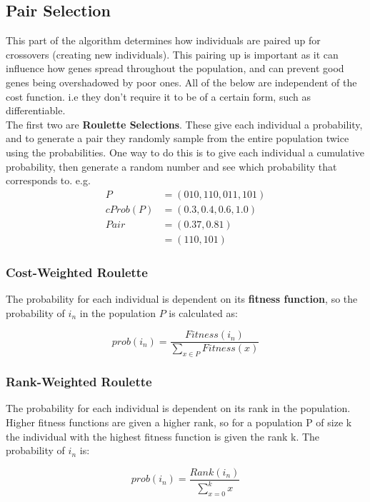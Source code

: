 \subsection{Pair Selection}
This part of the algorithm determines how individuals are paired up for crossovers (creating new individuals). This pairing up is important as it can influence how genes spread throughout the population, and can prevent good genes being overshadowed by poor ones. All of the below are independent of the cost function. i.e they don't require it to be of a certain form, such as differentiable. \\

\noindent The first two are \textbf{Roulette Selections}. These give each individual a probability, and to generate a pair they randomly sample from the entire population twice using the probabilities. One way to do this is to give each individual a cumulative probability, then generate a random number and see which probability that corresponds to. e.g.
\begin{align}
    P &= (010,110,011,101) \nonumber \\
    cProb(P) &= (0.3,0.4,0.6,1.0) \nonumber \\
    Pair &= (0.37,0.81) \nonumber \\
         &= (110,101) \nonumber
\end{align}


\subsubsection{Cost-Weighted Roulette}
The probability for each individual is dependent on its \textbf{fitness function}, so the probability of $i_n$ in the population $P$ is calculated as:
 
\begin{equation}
    prob(i_n) = \frac{Fitness(i_n)}{\sum_{x\in P} Fitness(x)}
\end{equation} 

\subsubsection{Rank-Weighted Roulette}
The probability for each individual is dependent on its rank in the population. Higher fitness functions are given a higher rank, so for a population P of size k the individual with the highest fitness function is given the rank k. The probability of $i_n$ is:

\begin{equation}
    prob(i_n) = \frac{Rank(i_n)}{\sum_{x=0}^k x}
\end{equation} 

